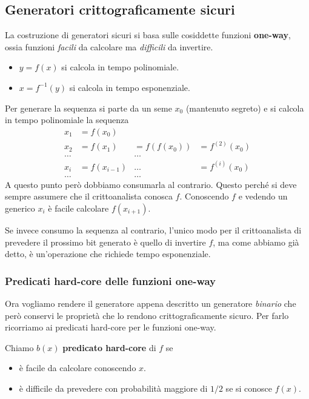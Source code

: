 \subsection{Generatori crittograficamente sicuri}
La costruzione di generatori sicuri si basa sulle cosiddette funzioni \textbf{one-way}, ossia funzioni \emph{facili} da
calcolare ma \emph{difficili} da invertire.
\begin{itemize}
	\item $y = f(x)$ si calcola in tempo polinomiale.
	\item $x = f^{-1}(y)$ si calcola in tempo esponenziale.
\end{itemize}
Per generare la sequenza si parte da un seme $x_0$ (mantenuto segreto) e si calcola in tempo polinomiale la sequenza
\[
	\begin{matrix}
		x_1   & = f(x_0)     &             &                \\
		x_2   & = f(x_1)     & = f(f(x_0)) & = f^{(2)}(x_0) \\
		\dots &              & \dots       &                \\
		x_i   & = f(x_{i-1}) & \dots       & = f^{(i)}(x_0) \\
		\dots &              & \dots       &
	\end{matrix}
\]
A questo punto per\`o dobbiamo consumarla al contrario. Questo perch\'e si deve sempre assumere che il crittoanalista
conosca $f$. Conoscendo $f$ e vedendo un generico $x_i$ \`e facile calcolare $f(x_{i+1})$.

Se invece consumo la sequenza al contrario, l'unico modo per il crittoanalista di prevedere il prossimo bit generato
\`e quello di invertire $f$, ma come abbiamo gi\`a detto, \`e un'operazione che richiede tempo esponenziale.

\subsubsection{Predicati hard-core delle funzioni one-way}
Ora vogliamo rendere il generatore appena descritto un generatore \emph{binario} che per\`o conservi le propriet\`a che
lo rendono crittograficamente sicuro. Per farlo ricorriamo ai predicati hard-core per le funzioni one-way.
\begin{definition}
	Chiamo $b(x)$ \textbf{predicato hard-core} di $f$ se
	\begin{itemize}
		\item \`e facile da calcolare conoscendo $x$.
		\item \`e difficile da prevedere con probabilit\`a maggiore di $1/2$ se si conosce $f(x)$.
	\end{itemize}
\end{definition}

